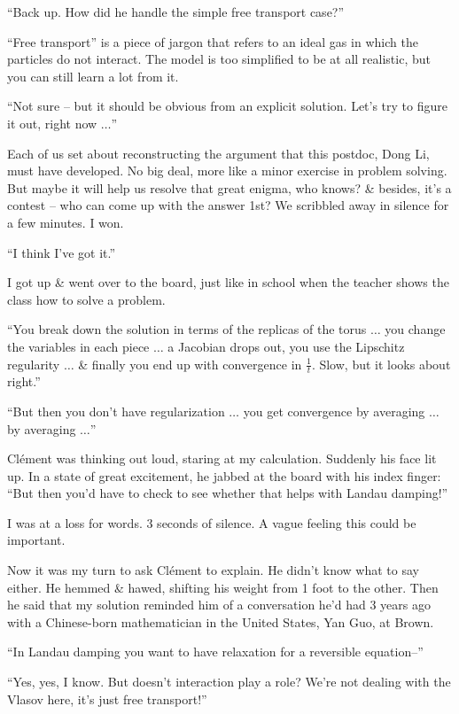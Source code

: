 \documentclass{article}
\numberwithin{equation}{section}
\begin{document}
``Back up. How did he handle the simple free transport case?''

``Free transport'' is a piece of jargon that refers to an ideal gas in which the particles do not interact. The model is too simplified to be at all realistic, but you can still learn a lot from it.

``Not sure -- but it should be obvious from an explicit solution. Let's try to figure it out, right now $\ldots$''

Each of us set about reconstructing the argument that this postdoc, Dong Li, must have developed. No big deal, more like a minor exercise in problem solving. But maybe it will help us resolve that great enigma, who knows? \& besides, it's a contest -- who can come up with the answer 1st? We scribbled away in silence for a few minutes. I won.

``I think I've got it.''

I got up \& went over to the board, just like in school when the teacher shows the class how to solve a problem.

``You break down the solution in terms of the replicas of the torus $\ldots$ you change the variables in each piece $\ldots$ a Jacobian drops out, you use the Lipschitz regularity $\ldots$ \& finally you end up with convergence in $\frac{1}{t}$. Slow, but it looks about right.''

``But then you don't have regularization $\ldots$ you get convergence by averaging $\ldots$ by averaging $\ldots$''

Cl\'ement was thinking out loud, staring at my calculation. Suddenly his face lit up. In a state of great excitement, he jabbed at the board with his index finger: ``But then you'd have to check to see whether that helps with Landau damping!''

I was at a loss for words. 3 seconds of silence. A vague feeling this could be important.

Now it was my turn to ask Cl\'ement to explain. He didn't know what to say either. He hemmed \& hawed, shifting his weight from 1 foot to the other. Then he said that my solution reminded him of a conversation he'd had 3 years ago with a Chinese-born mathematician in the United States, Yan Guo, at Brown.

``In Landau damping you want to have relaxation for a reversible equation--''

``Yes, yes, I know. But doesn't interaction play a role? We're not dealing with the Vlasov here, it's just free transport!''
\end{document}
